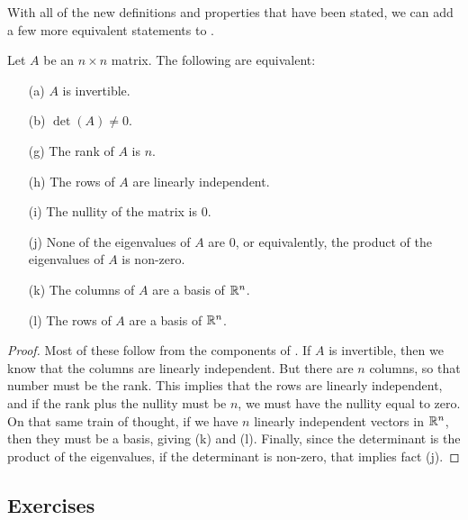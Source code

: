 With all of the new definitions and properties that have been stated, we can add a few more equivalent statements to . 

\begin{theorem1}{}
Let $A$ be an $n \times n$ matrix. The following are equivalent:
\begin{enumerate}
\item[(a)] $A$ is invertible.
\item[(b)] $\det(A) \neq 0$.
\item[(g)] The rank of $A$ is $n$.
\item[(h)] The rows of $A$ are linearly independent.
\item[(i)] The nullity of the matrix is $0$.
\item[(j)] None of the eigenvalues of $A$ are $0$, or equivalently, the product of the eigenvalues of $A$ is non-zero.
\item[(k)] The columns of $A$ are a basis of $\mathbb{R}^n$.
\item[(l)] The rows of $A$ are a basis of $\mathbb{R}^n$.  
\end{enumerate}
\end{theorem1}

\begin{proof}
Most of these follow from the components of . If $A$ is invertible, then we know that the columns are linearly independent. But there are $n$ columns, so that number must be the rank. This implies that the rows are linearly independent, and if the rank plus the nullity must be $n$, we must have the nullity equal to zero. On that same train of thought, if we have $n$ linearly independent vectors in $\mathbb{R}^n$, then they must be a basis, giving (k) and (l). Finally, since the determinant is the product of the eigenvalues, if the determinant is non-zero, that implies fact (j). 
\end{proof}

\subsection{Exercises}

